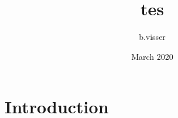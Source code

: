 \documentclass{article}
\title{tes}
\author{b.visser }
\date{March 2020}
\begin{document}
\maketitle

\section{Introduction}
\end{document}
